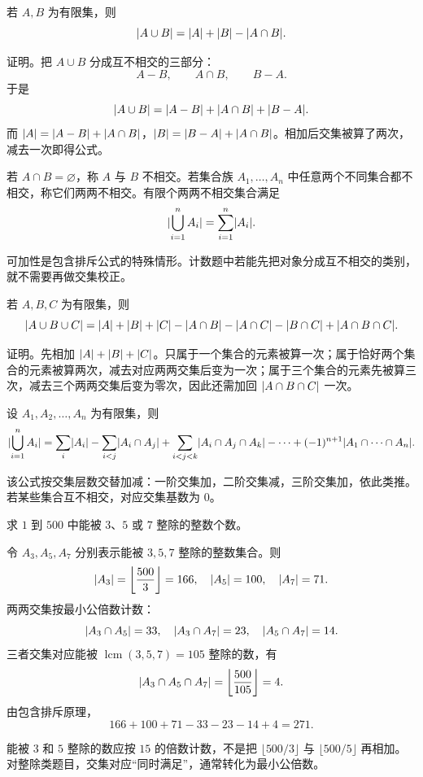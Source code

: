 \begin{theorem}[两个集合的包含排斥公式]\label{ch1-ie-two}
若 $A,B$ 为有限集，则
\[
  \lvert A\cup B\rvert=\lvert A\rvert+\lvert B\rvert-\lvert A\cap B\rvert.
\]
\end{theorem}

证明。把 $A\cup B$ 分成互不相交的三部分：
\[
  A-B,\qquad A\cap B,\qquad B-A.
\]
于是
\[
\lvert A\cup B\rvert=\lvert A-B\rvert+\lvert A\cap B\rvert+\lvert B-A\rvert.
\]
而 $\lvert A\rvert=\lvert A-B\rvert+\lvert A\cap B\rvert$，$\lvert B\rvert=\lvert B-A\rvert+\lvert A\cap B\rvert$。相加后交集被算了两次，减去一次即得公式。

\begin{definition}[互不相交与可加性]\label{ch1-disjoint-addition}
若 $A\cap B=\varnothing$，称 $A$ 与 $B$ 不相交。若集合族 $A_1,\ldots,A_n$ 中任意两个不同集合都不相交，称它们两两不相交。有限个两两不相交集合满足
\[
  \lvert\bigcup_{i=1}^n A_i\rvert=\sum_{i=1}^n \lvert A_i\rvert.
\]
\end{definition}

可加性是包含排斥公式的特殊情形。计数题中若能先把对象分成互不相交的类别，就不需要再做交集校正。

\begin{theorem}[三个集合的包含排斥公式]\label{ch1-ie-three}
若 $A,B,C$ 为有限集，则
\[
\lvert A\cup B\cup C\rvert
=\lvert A\rvert+\lvert B\rvert+\lvert C\rvert
-\lvert A\cap B\rvert-\lvert A\cap C\rvert-\lvert B\cap C\rvert
+\lvert A\cap B\cap C\rvert.
\]
\end{theorem}

证明。先相加 $\lvert A\rvert+\lvert B\rvert+\lvert C\rvert$。只属于一个集合的元素被算一次；属于恰好两个集合的元素被算两次，减去对应两两交集后变为一次；属于三个集合的元素先被算三次，减去三个两两交集后变为零次，因此还需加回 $\lvert A\cap B\cap C\rvert$ 一次。

\begin{theorem}[$n$ 个有限集合的包含排斥公式]\label{ch1-ie-n}
设 $A_1,A_2,\ldots,A_n$ 为有限集，则
\[
\lvert\bigcup_{i=1}^n A_i\rvert
=\sum_i\lvert A_i\rvert
-\sum_{i<j}\lvert A_i\cap A_j\rvert
+\sum_{i<j<k}\lvert A_i\cap A_j\cap A_k\rvert
-\cdots+(-1)^{n+1}\lvert A_1\cap\cdots\cap A_n\rvert.
\]
\end{theorem}

该公式按交集层数交替加减：一阶交集加，二阶交集减，三阶交集加，依此类推。若某些集合互不相交，对应交集基数为 $0$。

\begin{example}[title={整除计数}]\label{ch1-div-count}
求 $1$ 到 $500$ 中能被 $3$、$5$ 或 $7$ 整除的整数个数。
\begin{solution}
令 $A_3,A_5,A_7$ 分别表示能被 $3,5,7$ 整除的整数集合。则
\[
\lvert A_3\rvert=\left\lfloor\frac{500}{3}\right\rfloor=166,\quad
\lvert A_5\rvert=100,\quad
\lvert A_7\rvert=71.
\]
两两交集按最小公倍数计数：
\[
\lvert A_3\cap A_5\rvert=33,\quad
\lvert A_3\cap A_7\rvert=23,\quad
\lvert A_5\cap A_7\rvert=14.
\]
三者交集对应能被 $\operatorname{lcm}(3,5,7)=105$ 整除的数，有
\[
\lvert A_3\cap A_5\cap A_7\rvert=\left\lfloor\frac{500}{105}\right\rfloor=4.
\]
由包含排斥原理，
\[
166+100+71-33-23-14+4=271.
\]
\end{solution}
\end{example}

\begin{pitfall}[包含排斥中的交集层数]\label{ch1-ie-pitfall}
能被 $3$ 和 $5$ 整除的数应按 $15$ 的倍数计数，不是把 $\lfloor500/3\rfloor$ 与 $\lfloor500/5\rfloor$ 再相加。对整除类题目，交集对应“同时满足”，通常转化为最小公倍数。
\end{pitfall}
